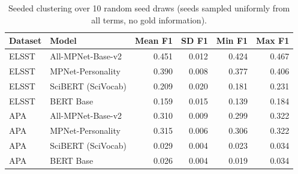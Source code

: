 \begin{table}[ht]
\centering
\small
\caption{Seeded clustering over 10 random seed draws (seeds sampled uniformly from all terms, no gold information).}
\label{tab:S9_seed_draws}
\begin{tabular}{llrrrr}
\toprule
Dataset & Model & Mean F1 & SD F1 & Min F1 & Max F1 \\
\midrule
ELSST & All-MPNet-Base-v2 & 0.451 & 0.012 & 0.424 & 0.467 \\
ELSST & MPNet-Personality & 0.390 & 0.008 & 0.377 & 0.406 \\
ELSST & SciBERT (SciVocab) & 0.209 & 0.020 & 0.181 & 0.231 \\
ELSST & BERT Base & 0.159 & 0.015 & 0.139 & 0.184 \\
APA & All-MPNet-Base-v2 & 0.310 & 0.009 & 0.299 & 0.322 \\
APA & MPNet-Personality & 0.315 & 0.006 & 0.306 & 0.322 \\
APA & SciBERT (SciVocab) & 0.029 & 0.004 & 0.023 & 0.034 \\
APA & BERT Base & 0.026 & 0.004 & 0.019 & 0.034 \\
\bottomrule
\end{tabular}
\end{table}
